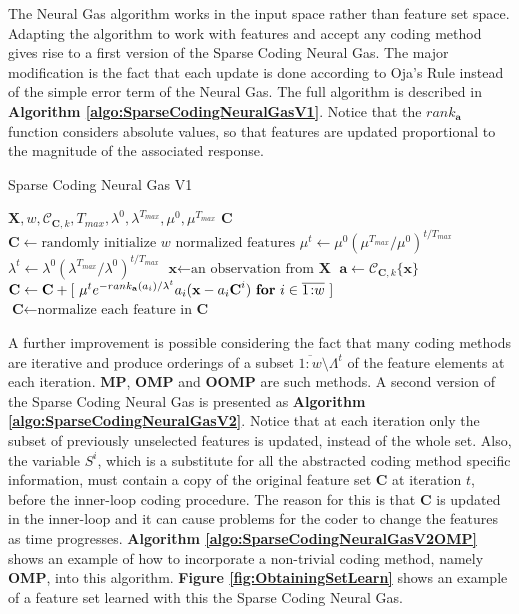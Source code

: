 \documentclass[12pt,a4paper,oneside,english]{UPBThesis}
\newcommand{\hcrange}[2]{\overline{{#1}\colon\!\!{#2}}}
\begin{document}
The Neural Gas algorithm works in the input space rather than feature set space. Adapting the algorithm to work with features and accept any coding method gives rise to a first version of the Sparse Coding Neural Gas. The major modification is the fact that each update is done according to Oja's Rule \cite{oja-rule} instead of the simple error term of the Neural Gas. The full algorithm is described in \textbf{Algorithm \ref{algo:SparseCodingNeuralGasV1}}. Notice that the $rank_{\textbf{a}}$ function considers absolute values, so that features are updated proportional to the magnitude of the associated response.

\begin{algorithm}
\caption{Sparse Coding Neural Gas V1}
\label{algo:SparseCodingNeuralGasV1}
\begin{algorithmic}
\Require $\textbf{X},w,\mathcal{C}_{\textbf{C},k},T_{max},\lambda^0,\lambda^{T_{max}},\mu^0,\mu^{T_{max}}$
\Ensure $\textbf{C}$
\State $\textbf{C} \gets \mbox{randomly initialize $w$ normalized features}$
\For {$t = \hcrange{1}{T_{max}}$}
\State $\mu^t \gets \mu^0 (\mu^{T_{max}} / \mu^0)^{t / T_{max}}$  
\State $\lambda^t \gets \lambda^0 (\lambda^{T_{max}} / \lambda^0)^{t / T_{max}}$ 
\State $\textbf{x} \gets \text{an observation from $\textbf{X}$}$
\State $\textbf{a} \gets \mathcal{C}_{\textbf{C},k}\{ \textbf{x} \}$
\State $\textbf{C} \gets \textbf{C} + [ ~ \mu^t e^{-rank_{\textbf{a}}(a_i) / \lambda^t} a_i (\textbf{x} - a_i \textbf{C}^i) ~ \mbox{\textbf{for} $i \in \hcrange{1}{w}$} ~ ]$
\State $\textbf{C} \gets \mbox{normalize each feature in $\textbf{C}$}$
\EndFor
\end{algorithmic}
\end{algorithm}

A further improvement is possible considering the fact that many coding methods are iterative and produce orderings of a subset $\hcrange{1}{w} \setminus \Lambda^t$ of the feature elements at each iteration. \textbf{MP}, \textbf{OMP} and \textbf{OOMP} are such methods. A second version of the Sparse Coding Neural Gas is presented as \textbf{Algorithm \ref{algo:SparseCodingNeuralGasV2}}. Notice that at each iteration only the subset of previously unselected features is updated, instead of the whole set. Also, the variable $S^i$, which is a substitute for all the abstracted coding method specific information, must contain a copy of the original feature set $\textbf{C}$ at iteration $t$, before the inner-loop coding procedure. The reason for this is that $\textbf{C}$ is updated in the inner-loop and it can cause problems for the coder to change the features as time progresses. \textbf{Algorithm \ref{algo:SparseCodingNeuralGasV2OMP}} shows an example of how to incorporate a non-trivial coding method, namely \textbf{OMP}, into this algorithm. \textbf{Figure \ref{fig:ObtainingSetLearn}} shows an example of a feature set learned with this the Sparse Coding Neural Gas.
\end{document}
